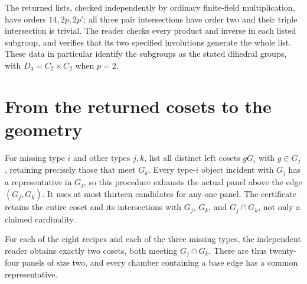 \documentclass[11pt,a4paper]{article}
\begin{document}
The returned lists, checked independently by ordinary finite-field
multiplication, have orders $14,2p,2p'$; all three pair intersections
have order two and their triple intersection is trivial. The reader checks
every product and inverse in each listed subgroup, and verifies that its
two specified involutions generate the whole list. These data in
particular identify the subgroups as the stated dihedral groups, with
$D_4=C_2\times C_2$ when $p=2$.

\section{From the returned cosets to the geometry}
For missing type $i$ and other types $j,k$, list all distinct left cosets
$gG_i$ with $g\in G_j$, retaining precisely those that meet $G_k$.
Every type-$i$ object incident with $G_j$ has a representative in $G_j$,
so this procedure exhausts the actual panel above the edge $(G_j,G_k)$.
It uses at most thirteen candidates for any one panel. The certificate
retains the entire coset and its intersections with $G_j$, $G_k$, and
$G_j\cap G_k$, not only a claimed cardinality.

For each of the eight recipes and each of the three missing types, the
independent reader obtains exactly two cosets, both meeting
$G_j\cap G_k$. There are thus twenty-four panels of size two, and every
chamber containing a base edge has a common representative.
\end{document}
